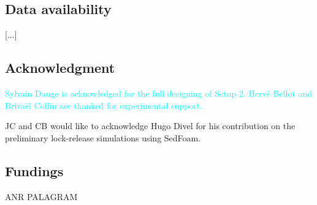 \documentclass[twocolumn]{article}
\newcommand*{\marie}{\textcolor{Cyan}}
\begin{document}
\subsection*{Data availability}

[...]


\subsection*{Acknowledgment}
\marie{Sylvain Dauge is acknowledged for the full designing of Setup 2. Hervé Bellot and Brivaël Collin are thanked for experimental support.}

JC and CB would like to acknowledge Hugo Divel for his contribution on the preliminary lock-release simulations using SedFoam.

\subsection*{Fundings}
ANR PALAGRAM



\end{document}
